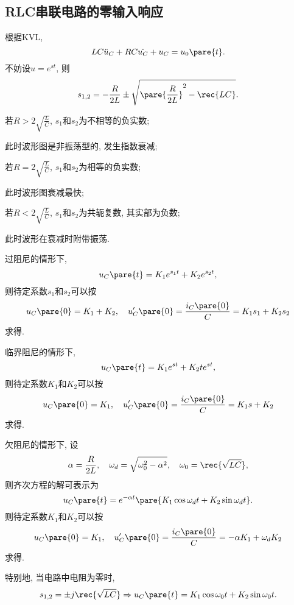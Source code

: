 \documentclass{ctexart}
\begin{document}
\subsection{RLC串联电路的零输入响应} %
\label{sub:rlc串联电路的零输入响应}
根据KVL,
\[ LC\ddot{u}_C + RC\dot{u_C} + u_C = u_0\pare{t}. \]
不妨设$u=e^{st}$, 则
\[ s_{1,2} = -\frac{R}{2L} \pm \sqrt{\pare{\frac{R}{2L}}^2 - \rec{LC}}. \]
\begin{cenum}
    \item 若$\displaystyle R > 2\sqrt{\frac{L}{C}}$, $s_1$和$s_2$为不相等的负实数;
    \begin{citem}
        \item 此时波形图是非振荡型的, 发生指数衰减;
    \end{citem}
    \item 若$\displaystyle R = 2\sqrt{\frac{L}{C}}$, $s_1$和$s_2$为相等的负实数;
    \begin{citem}
        \item 此时波形图衰减最快;
    \end{citem}
    \item 若$\displaystyle R < 2\sqrt{\frac{L}{C}}$, $s_1$和$s_2$为共轭复数, 其实部为负数;
    \begin{citem}
        \item 此时波形在衰减时附带振荡.
    \end{citem}
\end{cenum}
\par
过阻尼的情形下,
\[ u_C\pare{t} = K_1e^{s_1t} + K_2e^{s_2t}, \]
则待定系数$s_1$和$s_2$可以按
\[ u_C\pare{0} = K_1 + K_2,\quad u'_C\pare{0} = \frac{i_C\pare{0}}{C} = K_1s_1 + K_2s_2 \]
求得.
\par
临界阻尼的情形下,
\[ u_C\pare{t} = K_1e^{st} + K_2te^{st}, \]
则待定系数$K_1$和$K_2$可以按
\[ u_C\pare{0} = K_1,\quad u'_C\pare{0} = \frac{i_C\pare{0}}{C} = K_1s + K_2 \]
求得.
\par
欠阻尼的情形下, 设
\[ \alpha = \frac{R}{2L},\quad \omega_d = \sqrt{\omega_0^2 - \alpha^2},\quad \omega_0 = \rec{\sqrt{LC}}, \]
则齐次方程的解可表示为
\[ u_C\pare{t} = e^{-\alpha t} \pare{K_1\cos\omega_d t + K_2 \sin \omega_d t}. \]
则待定系数$K_1$和$K_2$可以按
\[ u_C\pare{0} = K_1,\quad u'_C\pare{0} = \frac{i_C\pare{0}}{C} = -\alpha K_1 + \omega_d K_2 \]
求得.
\par
特别地, 当电路中电阻为零时,
\[ s_{1,2} = \pm j \rec{\sqrt{LC}} \Rightarrow u_C\pare{t} = K_1 \cos \omega_0 t + K_2 \sin \omega_0 t. \]

\end{document}
